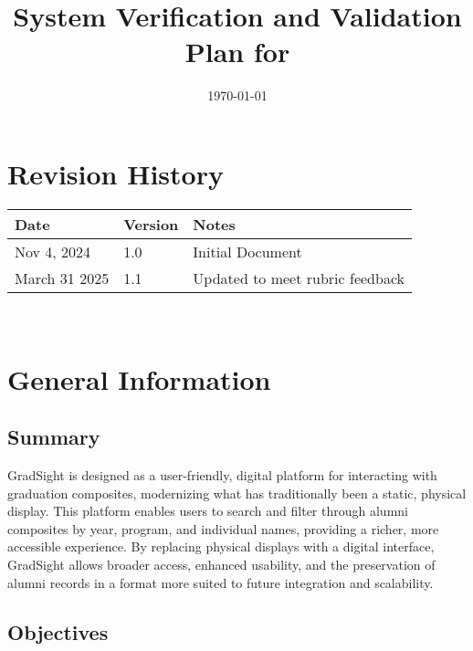 \documentclass[12pt, titlepage]{article}
\begin{document}
\title{System Verification and Validation Plan for \progname{}} 
\author{\authname}
\date{\today}
	
\maketitle


\section*{Revision History}

\begin{tabularx}{\textwidth}{p{3cm}p{2cm}X}
\toprule {\bf Date} & {\bf Version} & {\bf Notes}\\
\midrule
Nov 4, 2024 & 1.0 & Initial Document\\
March 31 2025& 1.1 & Updated to meet rubric feedback\\
\bottomrule
\end{tabularx}

~\\


\newpage

\tableofcontents

\listoftables




\newpage


\section{General Information}

\subsection{Summary}

GradSight is designed as a user-friendly, digital platform for interacting with graduation composites, modernizing what has traditionally been a static, physical display. This platform enables users to search and filter through alumni composites by year, program, and individual names, providing a richer, more accessible experience. By replacing physical displays with a digital interface, GradSight allows broader access, enhanced usability, and the preservation of alumni records in a format more suited to future integration and scalability.

\subsection{Objectives}
\end{document}
